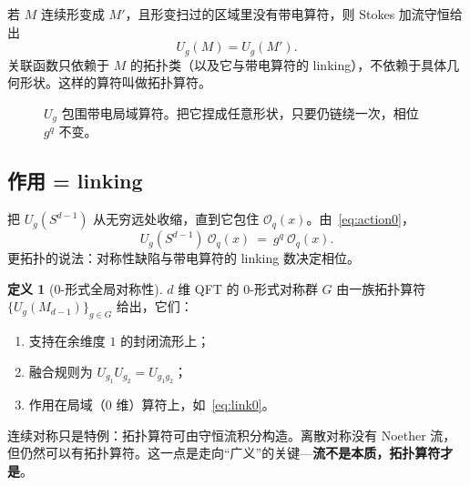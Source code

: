 \documentclass[11pt,a4paper]{article}
\theoremstyle{definition}
\newtheorem{definition}{定义}[section]
\theoremstyle{plain}
\theoremstyle{remark}
\begin{document}
若 $M$ 连续形变成 $M'$，且形变扫过的区域里没有带电算符，则 Stokes 加流守恒给出
\begin{equation}
  U_g(M)=U_g(M').
\end{equation}
关联函数只依赖于 $M$ 的拓扑类（以及它与带电算符的 linking），不依赖于具体几何形状。这样的算符叫做拓扑算符。

\begin{figure}[h]
\centering
{}
\caption{$U_g$ 包围带电局域算符。把它捏成任意形状，只要仍链绕一次，相位 $g^q$ 不变。}
\end{figure}

\subsection{作用 = linking}

把 $U_g(S^{d-1})$ 从无穷远处收缩，直到它包住 $\mathcal{O}_q(x)$。由~\eqref{eq:action0}，
\begin{equation}
\label{eq:link0}
  U_g(S^{d-1})\ \mathcal{O}_q(x)\ =\ g^{q}\ \mathcal{O}_q(x).
\end{equation}
更拓扑的说法：对称性缺陷与带电算符的 linking 数决定相位。

\begin{definition}[0-形式全局对称性]
$d$ 维 QFT 的 0-形式对称群 $G$ 由一族拓扑算符 $\{U_g(M_{d-1})\}_{g\in G}$ 给出，它们：
\begin{enumerate}[leftmargin=1.6em]
  \item 支持在余维度 $1$ 的封闭流形上；
  \item 融合规则为 $U_{g_1}U_{g_2}=U_{g_1g_2}$；
  \item 作用在局域（0 维）算符上，如~\eqref{eq:link0}。
\end{enumerate}
\end{definition}

连续对称只是特例：拓扑算符可由守恒流积分构造。离散对称没有 Noether 流，但仍然可以有拓扑算符。这一点是走向``广义''的关键---\textbf{流不是本质，拓扑算符才是}。
\end{document}
